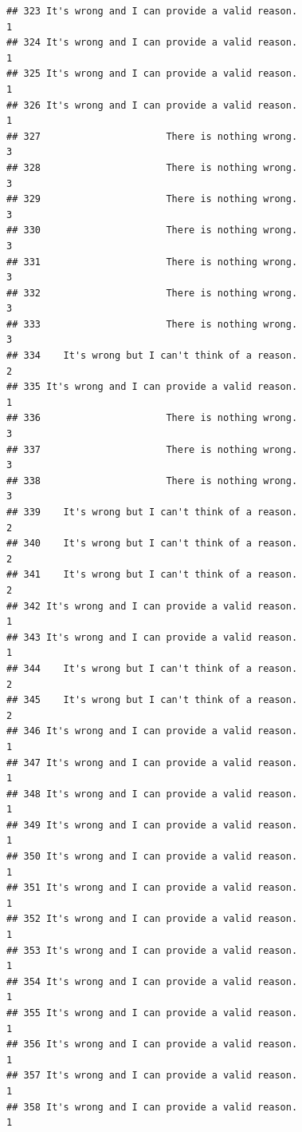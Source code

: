\documentclass[
  american,
  man,floatsintext]{apa7}
\begin{document}
\begin{verbatim}
## 323 It's wrong and I can provide a valid reason.                    1
## 324 It's wrong and I can provide a valid reason.                    1
## 325 It's wrong and I can provide a valid reason.                    1
## 326 It's wrong and I can provide a valid reason.                    1
## 327                      There is nothing wrong.                    3
## 328                      There is nothing wrong.                    3
## 329                      There is nothing wrong.                    3
## 330                      There is nothing wrong.                    3
## 331                      There is nothing wrong.                    3
## 332                      There is nothing wrong.                    3
## 333                      There is nothing wrong.                    3
## 334    It's wrong but I can't think of a reason.                    2
## 335 It's wrong and I can provide a valid reason.                    1
## 336                      There is nothing wrong.                    3
## 337                      There is nothing wrong.                    3
## 338                      There is nothing wrong.                    3
## 339    It's wrong but I can't think of a reason.                    2
## 340    It's wrong but I can't think of a reason.                    2
## 341    It's wrong but I can't think of a reason.                    2
## 342 It's wrong and I can provide a valid reason.                    1
## 343 It's wrong and I can provide a valid reason.                    1
## 344    It's wrong but I can't think of a reason.                    2
## 345    It's wrong but I can't think of a reason.                    2
## 346 It's wrong and I can provide a valid reason.                    1
## 347 It's wrong and I can provide a valid reason.                    1
## 348 It's wrong and I can provide a valid reason.                    1
## 349 It's wrong and I can provide a valid reason.                    1
## 350 It's wrong and I can provide a valid reason.                    1
## 351 It's wrong and I can provide a valid reason.                    1
## 352 It's wrong and I can provide a valid reason.                    1
## 353 It's wrong and I can provide a valid reason.                    1
## 354 It's wrong and I can provide a valid reason.                    1
## 355 It's wrong and I can provide a valid reason.                    1
## 356 It's wrong and I can provide a valid reason.                    1
## 357 It's wrong and I can provide a valid reason.                    1
## 358 It's wrong and I can provide a valid reason.                    1

\end{verbatim}
\end{document}
